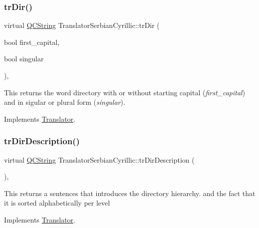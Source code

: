 \mbox{\label{class_translator_serbian_cyrillic_a462397fedbc0d84018b5482c516b0cb8}} 
\subsubsection{\texorpdfstring{trDir()}{trDir()}}
{\footnotesize\ttfamily virtual \mbox{\hyperlink{class_q_c_string}{Q\+C\+String}} Translator\+Serbian\+Cyrillic\+::tr\+Dir (\begin{DoxyParamCaption}\item[{bool}]{first\+\_\+capital,  }\item[{bool}]{singular }\end{DoxyParamCaption})\hspace{0.3cm}{\ttfamily [inline]}, {\ttfamily [virtual]}}

This returns the word directory with or without starting capital ({\itshape first\+\_\+capital}) and in sigular or plural form ({\itshape singular}). 

Implements \mbox{\hyperlink{class_translator}{Translator}}.

\mbox{\label{class_translator_serbian_cyrillic_a0b74ec2c3d074e381f42c6a7fa835af4}} 
\subsubsection{\texorpdfstring{trDirDescription()}{trDirDescription()}}
{\footnotesize\ttfamily virtual \mbox{\hyperlink{class_q_c_string}{Q\+C\+String}} Translator\+Serbian\+Cyrillic\+::tr\+Dir\+Description (\begin{DoxyParamCaption}{ }\end{DoxyParamCaption})\hspace{0.3cm}{\ttfamily [inline]}, {\ttfamily [virtual]}}

This returns a sentences that introduces the directory hierarchy. and the fact that it is sorted alphabetically per level 

Implements \mbox{\hyperlink{class_translator}{Translator}}.

